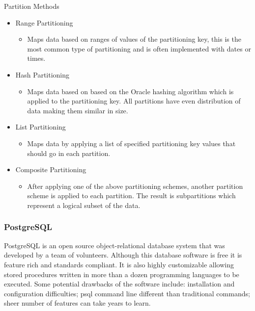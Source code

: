 \documentclass[draftclsnofoot, onecolumn, compsoc, 10pt]{IEEEtran}
\begin{document}
Partition Methods

\begin{itemize} 
	\item  Range Partitioning
    \begin{itemize} 
		\item Maps data based on ranges of values of the partitioning key, this is the most common type of partitioning and is often implemented with dates or times.
    \end{itemize}
    \item Hash Partitioning
    \begin{itemize} 
		\item Maps data based on based on the Oracle hashing algorithm which is applied to the partitioning key.
        All partitions have even distribution of data making them similar in size.
    \end{itemize}
    \item List Partitioning
    \begin{itemize} 
		\item Maps data by applying a list of specified partitioning key values that should go in each partition.
    \end{itemize}
    \item Composite Partitioning
    \begin{itemize} 
		\item After applying one of the above partitioning schemes, another partition scheme is applied to each partition.
        The result is subpartitions which represent a logical subset of the data.
    \end{itemize}
\end{itemize}
\subsubsection{PostgreSQL}
PostgreSQL is an open source object-relational database system that was developed by a team of volunteers.
Although this database software is free it is feature rich and standards compliant.
It is also highly customizable allowing stored procedures written in more than a dozen programming languages to be executed.
Some potential drawbacks of the software include: installation and configuration difficulties; psql command line different than traditional commands; sheer number of features can take years to learn.
\end{document}
